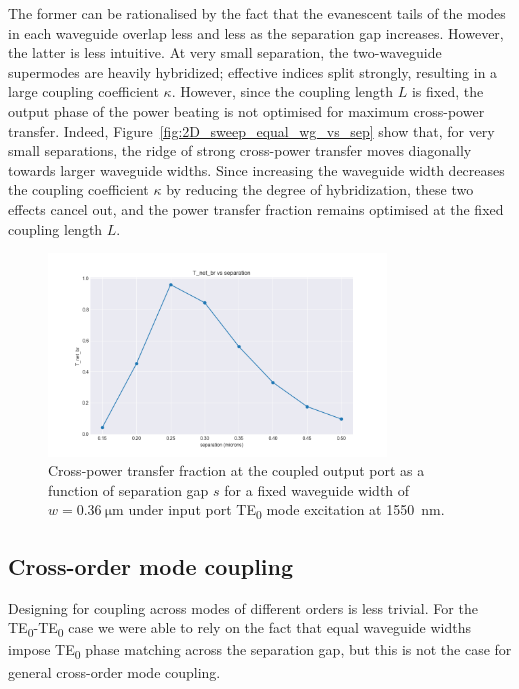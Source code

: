 \documentclass[10pt, a4paper]{article}
\begin{document}
The former can be rationalised by the fact that the evanescent tails of the modes in each waveguide overlap less and less as the separation gap increases.
However, the latter is less intuitive.
At very small separation,
the two-waveguide supermodes are heavily hybridized; effective indices split strongly,
resulting in a large coupling coefficient \(\kappa\). However, since the coupling length \(L\) is fixed,
the output phase of the power beating is not optimised for maximum cross-power transfer.
Indeed, Figure~\ref{fig:2D_sweep_equal_wg_vs_sep} show that, for very small separations,
the ridge of strong cross-power transfer moves diagonally towards larger waveguide widths.
Since increasing the waveguide width decreases the coupling coefficient \(\kappa\) by reducing the degree of hybridization,
these two effects cancel out, and the power transfer fraction remains optimised at the fixed coupling length \(L\).

\begin{figure}[h!]
  \centering
  \includegraphics[width=0.8\textwidth]{task3/sweep_plots/sweep_idx_10_sweep__coupling_length=10_wg1_width=0.3571428571428572_wg2_width=0.3571428571428572_separation=0.15_0.5_8_center_wavelength=1.55_T_net_br_line.png}
  \caption{Cross-power transfer fraction at the coupled output port as a function of separation gap \(s\) for a fixed waveguide width of \(w=\SI{0.36}{\um}\) under input port TE\textsubscript{0} mode excitation at \SI{1550}{\nm}.}
  \label{fig:coupled_power_ridge}
\end{figure}

\subsection{Cross-order mode coupling}

Designing for coupling across modes of different orders is less trivial. 
For the TE\textsubscript{0}-TE\textsubscript{0} case we were able to rely on the fact that equal waveguide widths impose TE\textsubscript{0} phase matching across the separation gap,
but this is not the case for general cross-order mode coupling.
\end{document}
